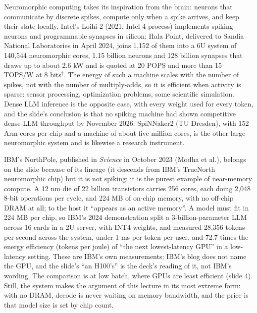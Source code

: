 \documentclass[11pt,letterpaper]{article}
\begin{document}
Neuromorphic computing takes its inspiration from the brain: neurons that communicate by discrete spikes, compute only when a spike arrives, and keep their state locally. Intel's Loihi 2 (2021, Intel 4 process) implements spiking neurons and programmable synapses in silicon; Hala Point, delivered to Sandia National Laboratories in April 2024, joins 1{,}152 of them into a 6U system of 140{,}544 neuromorphic cores, 1.15 billion neurons and 128 billion synapses that draws up to about 2.6 kW and is quoted at 20 POPS and more than 15 TOPS/W at 8 bits$^\dagger$. The energy of such a machine scales with the number of spikes, not with the number of multiply-adds, so it is efficient when activity is sparse: sensor processing, optimization problems, some scientific simulation. Dense LLM inference is the opposite case, with every weight used for every token, and the slide's conclusion is that no spiking machine had shown competitive dense-LLM throughput by November 2026. SpiNNaker2 (TU Dresden), with 152 Arm cores per chip and a machine of about five million cores, is the other large neuromorphic system and is likewise a research instrument.

IBM's NorthPole, published in \emph{Science} in October 2023 (Modha et al.), belongs on the slide because of its lineage (it descends from IBM's TrueNorth neuromorphic chip) but it is not spiking: it is the purest example of near-memory compute. A 12 nm die of 22 billion transistors carries 256 cores, each doing 2{,}048 8-bit operations per cycle, and 224 MB of on-chip memory, with no off-chip DRAM at all; to the host it ``appears as an active memory''. A model must fit in 224 MB per chip, so IBM's 2024 demonstration split a 3-billion-parameter LLM across 16 cards in a 2U server, with INT4 weights, and measured 28{,}356 tokens per second across the system, under 1 ms per token per user, and 72.7 times the energy efficiency (tokens per joule) of ``the next lowest-latency GPU'' in a low-latency setting. These are IBM's own measurements; IBM's blog does not name the GPU, and the slide's ``an H100's'' is the deck's reading of it, not IBM's wording. The comparison is at low batch, where GPUs are least efficient (slide 4). Still, the system makes the argument of this lecture in its most extreme form: with no DRAM, decode is never waiting on memory bandwidth, and the price is that model size is set by chip count.
\end{document}
